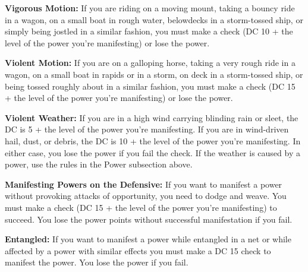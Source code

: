 \textbf{Vigorous Motion:} If you are riding on a moving mount, taking a bouncy ride in a wagon, on a small boat in rough water, belowdecks in a storm-tossed ship, or simply being jostled in a similar fashion, you must make a  check (DC 10 + the level of the power you're manifesting) or lose the power.

\textbf{Violent Motion:} If you are on a galloping horse, taking a very rough ride in a wagon, on a small boat in rapids or in a storm, on deck in a storm-tossed ship, or being tossed roughly about in a similar fashion, you must make a  check (DC 15 + the level of the power you're manifesting) or lose the power.

\textbf{Violent Weather:} If you are in a high wind carrying blinding rain or sleet, the DC is 5 + the level of the power you're manifesting. If you are in wind-driven hail, dust, or debris, the DC is 10 + the level of the power you're manifesting. In either case, you lose the power if you fail the  check. If the weather is caused by a power, use the rules in the Power subsection above.

\textbf{Manifesting Powers on the Defensive:} If you want to manifest a power without provoking attacks of opportunity, you need to dodge and weave. You must make a  check (DC 15 + the level of the power you're manifesting) to succeed. You lose the power points without successful manifestation if you fail.

\textbf{Entangled:} If you want to manifest a power while entangled in a net or while affected by a power with similar effects you must make a DC 15  check to manifest the power. You lose the power if you fail.
